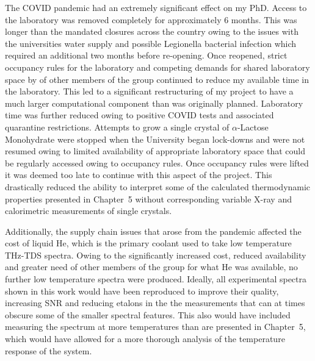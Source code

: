 The COVID pandemic had an extremely significant effect on my PhD. Access to the laboratory was removed completely for approximately 6 months. This was longer than the mandated closures across the country owing to the issues with the universities water supply and possible Legionella bacterial infection which required an additional two months before re\nobreakdash-opening.  Once reopened, strict occupancy rules for the laboratory and competing demands for shared laboratory space by of other members of the group continued to reduce my available time in the laboratory. This led to a significant restructuring of my project to have a much larger computational component than was originally planned. Laboratory time was further reduced owing to positive COVID tests and associated quarantine restrictions. Attempts to grow a single crystal of \(\alpha\)-Lactose Monohydrate were stopped when the University began lock\nobreakdash-downs and were not resumed owing to limited availability of appropriate laboratory space that could be regularly accessed owing to occupancy rules.  Once occupancy rules were lifted it was deemed too late to continue with this aspect of the project. This drastically reduced the ability to interpret some of the calculated thermodynamic properties presented in Chapter~5 without corresponding variable X-ray and calorimetric measurements of single crystals.

Additionally, the supply chain issues that arose from the pandemic affected the cost of liquid He, which is the primary coolant used to take low temperature THz-TDS spectra. Owing to the significantly increased cost, reduced availability and greater need of other members of the group for what He was available, no further low temperature spectra were produced. Ideally, all experimental spectra shown in this work would have been reproduced to improve their quality, increasing SNR and reducing etalons in the the measurements that can at times obscure some of the smaller spectral features. This also would have included measuring the spectrum at more temperatures than are presented in Chapter~5, which would have allowed for a more thorough analysis of the temperature response of the system. 

